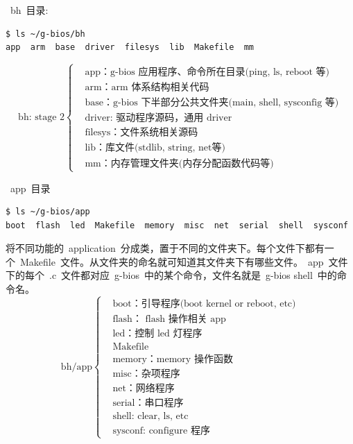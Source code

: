 \documentclass[a4paper,11pt]{book}
\begin{document}
\begin{CJK*}{UTF8}{gbsn}
~bh~目录:
\begin{lstlisting}[language=bash, numbers=none]
$ ls ~/g-bios/bh
app  arm  base  driver  filesys  lib  Makefile  mm
\end{lstlisting}

\begin{equation*}
\text{bh: stage 2}
\left\{
	\begin{aligned}
	&\text{app：g-bios~应用程序、命令所在目录(ping, ls, reboot~等)} \\
	&\text{arm：arm~体系结构相关代码} \\
	&\text{base：g-bios~下半部分公共文件夹(main, shell, sysconfig~等)} \\
	&\text{driver: 驱动程序源码，通用~driver~} \\
	&\text{filesys：文件系统相关源码} \\
	&\text{lib：库文件(stdlib, string, net等)} \\
	&\text{mm：内存管理文件夹(内存分配函数代码等)}
	\end{aligned}
\right.
\end{equation*}

~app~目录

\begin{lstlisting}[language=bash, numbers=none]
$ ls ~/g-bios/app
boot  flash  led  Makefile  memory  misc  net  serial  shell  sysconf
\end{lstlisting}
将不同功能的~application~分成类，置于不同的文件夹下。每个文件下都有一个~Makefile~文件。从文件夹的命名就可知道其文件夹下有哪些文件。~app~文件下的每个~.c~文件都对应~g-bios~中的某个命令，文件名就是~g-bios shell~中的命令名。
\begin{equation*}
\text{bh/app}
\left\{
	\begin{aligned}
	&\text{boot：引导程序(boot kernel or reboot, etc)} \\
	&\text{flash：~flash~操作相关~app~} \\
	&\text{led：控制~led~灯程序} \\
	&\text{Makefile} \\
	&\text{memory：memory~操作函数} \\
	&\text{misc：杂项程序} \\
	&\text{net：网络程序} \\
	&\text{serial：串口程序} \\
	&\text{shell: clear, ls, etc} \\
	&\text{sysconf: configure~程序}
	\end{aligned}
\right.
\end{equation*}


\end{CJK*}
\end{document}
